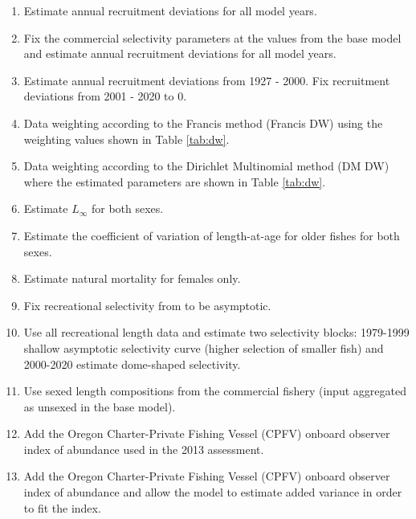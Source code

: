 \documentclass[11pt,
  english,
  a4paper,
]{article}
\begin{document}
\begin{enumerate}
   
  \item Estimate annual recruitment deviations for all model years.

  \item Fix the commercial selectivity parameters at the values from the base model and estimate annual recruitment deviations for all model years.

  \item Estimate annual recruitment deviations from 1927 - 2000. Fix recruitment deviations from 2001 - 2020 to 0.

  \item Data weighting according to the Francis method (Francis DW) using the weighting values shown in Table \ref{tab:dw}. 
  
  \item Data weighting according to the Dirichlet Multinomial method (DM DW) where the estimated parameters are shown in Table \ref{tab:dw}. 

  \item Estimate $L_{\infty}$ for both sexes.

  \item Estimate the coefficient of variation of length-at-age for older fishes for both sexes.

  \item Estimate natural mortality for females only.

  \item Fix recreational selectivity from to be asymptotic. 

  \item Use all recreational length data and estimate two selectivity blocks: 1979-1999 shallow asymptotic selectivity curve (higher selection of smaller fish) and 2000-2020 estimate dome-shaped selectivity.   

  \item Use sexed length compositions from the commercial fishery (input aggregated as unsexed in the base model).

  \item Add the Oregon Charter-Private Fishing Vessel (CPFV) onboard observer index of abundance used in the 2013 assessment.

  \item Add the Oregon Charter-Private Fishing Vessel (CPFV) onboard observer index of abundance and allow the model to estimate added variance in order to fit the index.

\end{enumerate}
\end{document}
